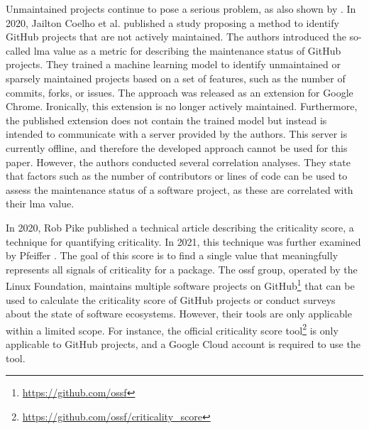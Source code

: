 Unmaintained projects continue to pose a serious problem, as also shown by \cite{236368}.
In 2020, Jailton Coelho et al. published a study \cite{COELHO2020106274} proposing a method to identify GitHub projects that are not actively maintained.
The authors introduced the so-called \gls{lma} value as a metric for describing the maintenance status of GitHub projects.
They trained a machine learning model to identify unmaintained or sparsely maintained projects based on a set of features, such as the number of commits, forks, or issues.
The approach was released as an extension for Google Chrome.
Ironically, this extension is no longer actively maintained.
Furthermore, the published extension does not contain the trained model but instead is intended to communicate with a server provided by the authors.
This server is currently offline, and therefore the developed approach cannot be used for this paper.
However, the authors conducted several correlation analyses.
They state that factors such as the number of contributors or lines of code can be used to assess the maintenance status of a software project, as these are correlated with their \gls{lma} value.


In 2020, Rob Pike published a technical article \cite{pike2020} describing the criticality score, a technique for quantifying criticality.
In 2021, this technique was further examined by Pfeiffer \cite{pfeiffer}.
The goal of this score is to find a single value that meaningfully represents all signals of criticality for a package.
The \gls{ossf} group, operated by the Linux Foundation, maintains multiple software projects on GitHub\footnote{\url{https://github.com/ossf}} that can be used to calculate the criticality score of GitHub projects or conduct surveys about the state of software ecosystems.
However, their tools are only applicable within a limited scope.
For instance, the official criticality score tool\footnote{\url{https://github.com/ossf/criticality_score}} is only applicable to GitHub projects, and a Google Cloud account is required to use the tool.
